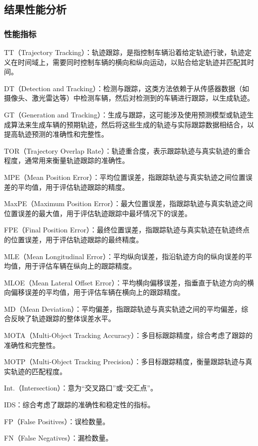 \subsection{结果性能分析}
\subsubsection{性能指标}
TT（Trajectory Tracking）：轨迹跟踪，是指控制车辆沿着给定轨迹行驶，轨迹定义在时间域上，需要同时控制车辆的横向和纵向运动，以贴合给定轨迹并匹配其时间。

DT（Detection and Tracking）：检测与跟踪，这类方法依赖于从传感器数据（如摄像头、激光雷达等）中检测车辆，然后对检测到的车辆进行跟踪，以生成轨迹。

GT（Generation and Tracking）：生成与跟踪，这可能涉及使用预测模型或轨迹生成算法来生成车辆的预期轨迹，然后将这些生成的轨迹与实际跟踪数据相结合，以提高轨迹预测的准确性和完整性。

TOR（Trajectory Overlap Rate）：轨迹重合度，表示跟踪轨迹与真实轨迹的重合程度，通常用来衡量轨迹跟踪的准确性。

MPE（Mean Position Error）：平均位置误差，指跟踪轨迹与真实轨迹之间位置误差的平均值，用于评估轨迹跟踪的精度。

MaxPE（Maximum Position Error）：最大位置误差，指跟踪轨迹与真实轨迹之间位置误差的最大值，用于评估轨迹跟踪中最坏情况下的误差。

FPE（Final Position Error）：最终位置误差，指跟踪轨迹与真实轨迹在轨迹终点的位置误差，用于评估轨迹跟踪的最终精度。

MLE（Mean Longitudinal Error）：平均纵向误差，指沿轨迹方向的纵向误差的平均值，用于评估车辆在纵向上的跟踪精度。

MLOE（Mean Lateral Offset Error）：平均横向偏移误差，指垂直于轨迹方向的横向偏移误差的平均值，用于评估车辆在横向上的跟踪精度。

MD（Mean Deviation）：平均偏差，指跟踪轨迹与真实轨迹之间的平均偏差，综合反映了轨迹跟踪的整体误差水平。

MOTA（Multi-Object Tracking Accuracy）：多目标跟踪精度，综合考虑了跟踪的准确性和完整性。

MOTP（Multi-Object Tracking Precision）：多目标跟踪精度，衡量跟踪轨迹与真实轨迹的匹配程度。

Int.（Intersection）：意为“交叉路口”或“交汇点”。

IDS：综合考虑了跟踪的准确性和稳定性的指标。

FP（False Positives）：误检数量。

FN（False Negatives）：漏检数量。

